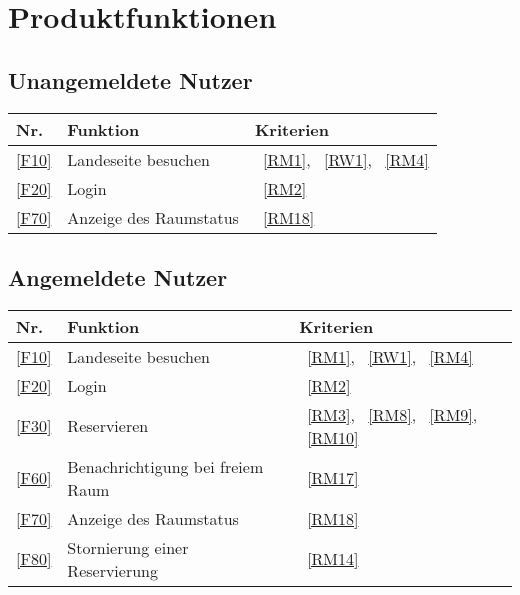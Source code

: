 

\chapter{Produktfunktionen}
\label{chap:product_functions}

\section{Unangemeldete Nutzer}\label{sec:unangemeldete-benutzer-funktionen}
\begin{table}[htbp]
    \centering
    \begin{tabularx}{\textwidth}{ l|X|l }
        \textbf{Nr.} & \textbf{Funktion} & \textbf{Kriterien} \\ \hline\hline
        \ref{F10} & Landeseite besuchen &~\ref{RM1}, ~\ref{RW1}, ~\ref{RM4} \\
        \ref{F20} & Login &~\ref{RM2} \\
        \ref{F70} & Anzeige des Raumstatus &~\ref{RM18} \\
    \end{tabularx}
    \label{tab:non_loggedin_functions}
\end{table}

\section{Angemeldete Nutzer}\label{sec:angemeldete-benutzer-funktionen}
\begin{table}[htbp]
    \centering
    \begin{tabularx}{\textwidth}{ l|X|l }
        \textbf{Nr.} & \textbf{Funktion} & \textbf{Kriterien} \\ \hline\hline
        \ref{F10} & Landeseite besuchen &~\ref{RM1}, ~\ref{RW1}, ~\ref{RM4} \\
        \ref{F20} & Login &~\ref{RM2} \\
        \ref{F30} & Reservieren &~\ref{RM3}, ~\ref{RM8}, ~\ref{RM9}, ~\ref{RM10} \\
        \ref{F60} & Benachrichtigung bei freiem Raum &~\ref{RM17} \\
        \ref{F70} & Anzeige des Raumstatus &~\ref{RM18} \\
        \ref{F80} & Stornierung einer Reservierung &~\ref{RM14} \\
    \end{tabularx}
    \label{tab:loggedin_functions}
\end{table}

